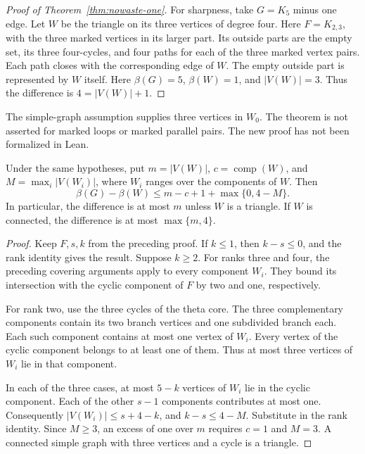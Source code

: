 \begin{proof}[Proof of Theorem~\ref{thm:nowaste-one}]
For sharpness, take $G=K_5$ minus one edge.
Let $W$ be the triangle on its three vertices of degree four.
Here $F=K_{2,3}$, with the three marked vertices in its larger part.
Its outside parts are the empty set, its three four-cycles, and four paths for each of the three marked vertex pairs.
Each path closes with the corresponding edge of $W$.
The empty outside part is represented by $W$ itself.
Here $\beta(G)=5$, $\beta(W)=1$, and $|V(W)|=3$.
Thus the difference is $4=|V(W)|+1$.
\end{proof}

The simple-graph assumption supplies three vertices in $W_0$.
The theorem is not asserted for marked loops or marked parallel pairs.
The new proof has not been formalized in Lean.


\begin{corollary}\label{cor:nowaste-component}
Under the same hypotheses, put $m=|V(W)|$, $c=\operatorname{comp}(W)$, and
$M=\max_i |V(W_i)|$, where $W_i$ ranges over the components of $W$.
Then
\[
 \beta(G)-\beta(W)
 \le m-c+1+\max\{0,4-M\}.
\]
In particular, the difference is at most $m$ unless $W$ is a triangle.
If $W$ is connected, the difference is at most $\max\{m,4\}$.
\end{corollary}

\begin{proof}
Keep $F,s,k$ from the preceding proof.
If $k\le1$, then $k-s\le0$, and the rank identity gives the result.
Suppose $k\ge2$.
For ranks three and four, the preceding covering arguments apply to every component $W_i$.
They bound its intersection with the cyclic component of $F$ by two and one, respectively.

For rank two, use the three cycles of the theta core.
The three complementary components contain its two branch vertices and one subdivided branch each.
Each such component contains at most one vertex of $W_i$.
Every vertex of the cyclic component belongs to at least one of them.
Thus at most three vertices of $W_i$ lie in that component.

In each of the three cases, at most $5-k$ vertices of $W_i$ lie in the cyclic component.
Each of the other $s-1$ components contributes at most one.
Consequently $|V(W_i)|\le s+4-k$, and $k-s\le4-M$.
Substitute in the rank identity.
Since $M\ge3$, an excess of one over $m$ requires $c=1$ and $M=3$.
A connected simple graph with three vertices and a cycle is a triangle.
\end{proof}


